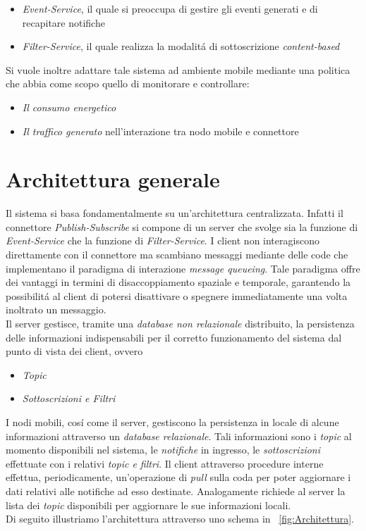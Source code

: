 \documentclass{article}
\begin{document}
\begin{itemize}
\item{\textit{Event-Service}, il quale si preoccupa di gestire gli eventi generati e di recapitare notifiche}
\item{\textit{Filter-Service}, il quale realizza la modalit\'a di sottoscrizione \textit{content-based}}
\end{itemize}

Si vuole inoltre adattare tale sistema ad ambiente mobile mediante una politica che abbia come scopo quello di monitorare e controllare:

\begin{itemize}
\item{\textit{Il consumo energetico}}
\item{\textit{Il traffico generato} nell'interazione tra nodo mobile e connettore}
\end{itemize}

\section{Architettura generale}

Il sistema si basa fondamentalmente su un'architettura centralizzata. Infatti il connettore \textit{Publish-Subscribe} si compone di un server che svolge sia la funzione di \textit{Event-Service} che la funzione di \textit{Filter-Service}. I client non interagiscono direttamente con il connettore ma scambiano messaggi mediante delle code che implementano il paradigma di interazione \textit{message queueing}. Tale paradigma offre dei vantaggi in termini di disaccoppiamento spaziale e temporale, garantendo la possibilit\'a al client di potersi disattivare o spegnere immediatamente una volta inoltrato un messaggio.
\\
Il server gestisce, tramite una \textit{database non relazionale} distribuito, la persistenza delle informazioni indispensabili per il corretto funzionamento del sistema dal punto di vista dei client, ovvero

\begin{itemize}
\item{\textit{Topic}}
\item{\textit{Sottoscrizioni e Filtri}}
\end{itemize}

I nodi mobili, cos\'i come il server, gestiscono la persistenza in locale di alcune informazioni attraverso un \textit{database relazionale}. Tali informazioni sono i \textit{topic} al momento disponibili nel sistema, le \textit{notifiche} in ingresso, le \textit{sottoscrizioni} effettuate con i relativi \textit{topic e filtri}. Il client attraverso procedure interne effettua, periodicamente,  un'operazione di \textit{pull} sulla coda per poter aggiornare i dati relativi alle notifiche ad esso destinate. Analogamente richiede al server la lista dei \textit{topic} disponibili per aggiornare le sue informazioni locali.\\
Di seguito illustriamo l'architettura attraverso uno schema in \figurename{~\ref{fig:Architettura}}.
\end{document}
